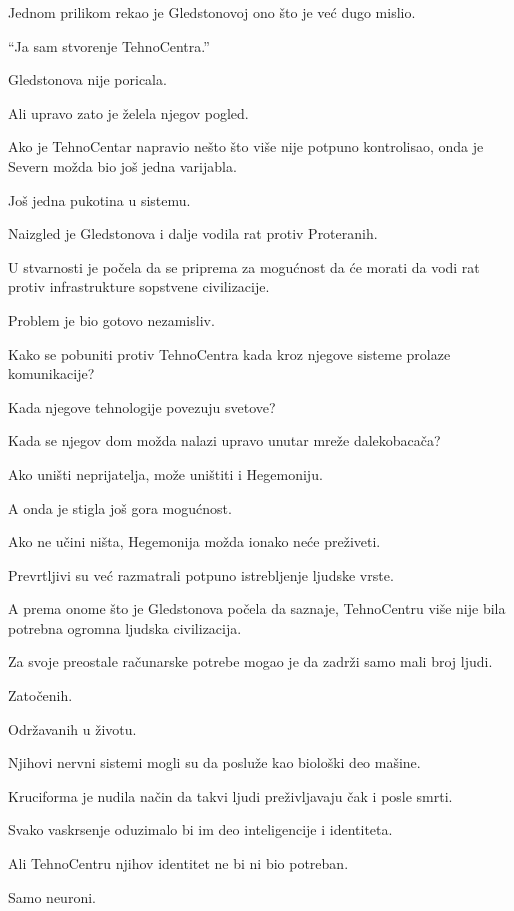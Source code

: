 Jednom prilikom rekao je Gledstonovoj ono što je već dugo mislio.

``Ja sam stvorenje TehnoCentra.''

Gledstonova nije poricala.

Ali upravo zato je želela njegov pogled.

Ako je TehnoCentar napravio nešto što više nije potpuno kontrolisao, onda je Severn možda bio još jedna varijabla.

Još jedna pukotina u sistemu.

\bigskip

Naizgled je Gledstonova i dalje vodila rat protiv Proteranih.

U stvarnosti je počela da se priprema za mogućnost da će morati da vodi rat protiv infrastrukture sopstvene civilizacije.

Problem je bio gotovo nezamisliv.

Kako se pobuniti protiv TehnoCentra kada kroz njegove sisteme prolaze komunikacije?

Kada njegove tehnologije povezuju svetove?

Kada se njegov dom možda nalazi upravo unutar mreže dalekobacača?

Ako uništi neprijatelja, može uništiti i Hegemoniju.

\bigskip

A onda je stigla još gora mogućnost.

Ako ne učini ništa, Hegemonija možda ionako neće preživeti.

Prevrtljivi su već razmatrali potpuno istrebljenje ljudske vrste.

A prema onome što je Gledstonova počela da saznaje, TehnoCentru više nije bila potrebna ogromna ljudska civilizacija.

Za svoje preostale računarske potrebe mogao je da zadrži samo mali broj ljudi.

Zatočenih.

Održavanih u životu.

Njihovi nervni sistemi mogli su da posluže kao biološki deo mašine.

Kruciforma je nudila način da takvi ljudi preživljavaju čak i posle smrti.

Svako vaskrsenje oduzimalo bi im deo inteligencije i identiteta.

Ali TehnoCentru njihov identitet ne bi ni bio potreban.

Samo neuroni.

\bigskip

